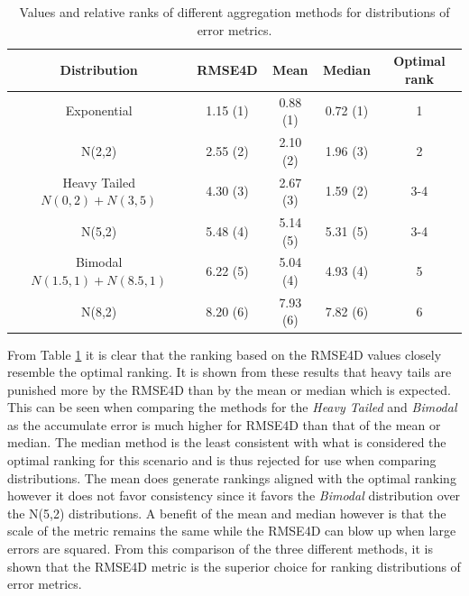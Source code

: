 \begin{table}[htp]
  \centering
  \begin{tabular}{ccccc}
    Distribution                     & RMSE4D   & Mean     & Median   & Optimal rank \\
    \hline
    Exponential                      & 1.15 (1) & 0.88 (1) & 0.72 (1) & 1            \\
    \hline
    N(2,2)                           & 2.55 (2) & 2.10 (2) & 1.96 (3) & 2            \\
    \hline
    Heavy Tailed \(N(0,2) + N(3,5)\) & 4.30 (3) & 2.67 (3) & 1.59 (2) & 3-4          \\
    \hline
    N(5,2)                           & 5.48 (4) & 5.14 (5) & 5.31 (5) & 3-4          \\
    \hline
    Bimodal \(N(1.5,1) + N(8.5,1)\)  & 6.22 (5) & 5.04 (4) & 4.93 (4) & 5            \\ %
    \hline
    N(8,2)                           & 8.20 (6) & 7.93 (6) & 7.82 (6) & 6            \\
    \hline
  \end{tabular}
  \caption{Values and relative ranks of different aggregation methods for distributions of error metrics.}
  \label{tab:evaluation_crayon_score}
\end{table}

From Table \ref{tab:evaluation_crayon_score} it is clear that the ranking based on the RMSE4D values closely resemble the optimal ranking. It is shown from these results that heavy tails are punished more by the RMSE4D than by the mean or median which is expected. This can be seen when comparing the methods for the \textit{Heavy Tailed} and \textit{Bimodal} as the accumulate error is much higher for RMSE4D than that of the mean or median. The median method is the least consistent with what is considered the optimal ranking for this scenario and is thus rejected for use when comparing distributions. The mean does generate rankings aligned with the optimal ranking however it does not favor consistency since it favors the \textit{Bimodal} distribution over the N(5,2) distributions. A benefit of the mean and median however is that the scale of the metric remains the same while the RMSE4D can blow up when large errors are squared. From this comparison of the three different methods, it is shown that the RMSE4D metric is the superior choice for ranking distributions of error metrics.

